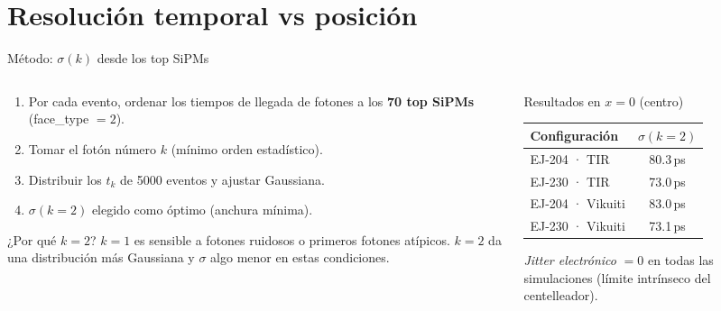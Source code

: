 \documentclass[aspectratio=169,10pt]{beamer}
\begin{document}
\section{Resolución temporal vs posición}

\begin{frame}{Método: $\sigma(k)$ desde los top SiPMs}

\begin{columns}[T]
  \begin{column}{0.55\textwidth}
  \footnotesize
  \begin{enumerate}
    \item Por cada evento, ordenar los tiempos de llegada de fotones
          a los \textbf{70 top SiPMs} (face\_type $=2$).
    \item Tomar el fotón número $k$ (mínimo orden estadístico).
    \item Distribuir los $t_k$ de 5000 eventos y ajustar Gaussiana.
    \item $\sigma(k=2)$ elegido como óptimo (anchura mínima).
  \end{enumerate}

  \vspace{0.5em}
  \begin{block}{¿Por qué $k=2$?}
    $k=1$ es sensible a fotones ruidosos o primeros fotones
    atípicos. $k=2$ da una distribución más Gaussiana y
    $\sigma$ algo menor en estas condiciones.
  \end{block}
  \end{column}

  \begin{column}{0.43\textwidth}
  \begin{block}{Resultados en $x=0$ (centro)}
    \footnotesize
    \begin{tabular}{@{}lc@{}}
      \toprule
      Configuración & $\sigma(k=2)$ \\
      \midrule
      \color{ej204col}EJ-204 · TIR     & 80.3\,ps \\
      \color{ej230col}EJ-230 · TIR     & 73.0\,ps \\
      \color{ej204col}EJ-204 · Vikuiti & 83.0\,ps \\
      \color{ej230col}EJ-230 · Vikuiti & 73.1\,ps \\
      \bottomrule
    \end{tabular}
  \end{block}

  \vspace{0.4em}
  \footnotesize
  \textit{Jitter electrónico} $= 0$ en todas las simulaciones
  (límite intrínseco del centelleador).
  \end{column}
\end{columns}
\end{frame}
\end{document}
